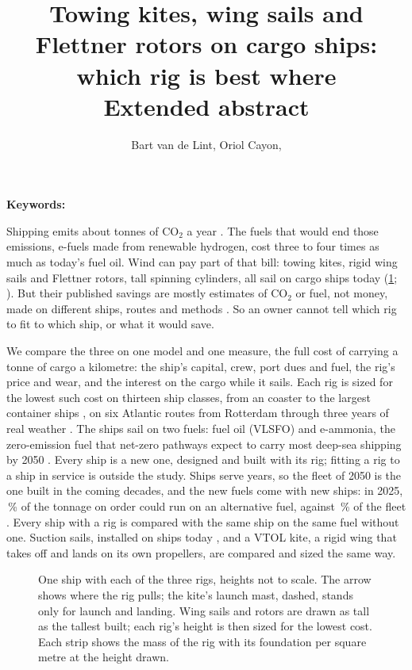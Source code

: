 \documentclass[10pt,a4paper]{article}
\title{\vspace{-1.5cm}Towing kites, wing sails and Flettner rotors on cargo ships: which rig is best where\\[0.3ex]\large Extended abstract\\[0.5ex]\small\itshape\confidential}
\author{Bart van de Lint, Oriol Cayon, \tbd{co-authors}}
\date{}
\begin{document}
\maketitle
\vspace{-1cm}

\fidelitynote

\noindent\textbf{Keywords:} \keywordlist{;}

Shipping emits about  tonnes of CO$_2$ a year \citep{faber2020}. The fuels that would end those emissions, e-fuels made from renewable hydrogen, cost three to four times as much as today's fuel oil. Wind can pay part of that bill: towing kites, rigid wing sails and Flettner rotors, tall spinning cylinders, all sail on cargo ships today (\cref{ea:rigs}; \citealp{emsa2023}). But their published savings are mostly estimates of CO$_2$ or fuel, not money, made on different ships, routes and methods \citep{huang2025}. So an owner cannot tell which rig to fit to which ship, or what it would save.

We compare the three on one model and one measure, the full cost of carrying a tonne of cargo a kilometre: the ship's capital, crew, port dues and fuel, the rig's price and wear, and the interest on the cargo while it sails. Each rig is sized for the lowest such cost on thirteen ship classes, from an  coaster to the largest container ships \citep{faber2020}, on six Atlantic routes from Rotterdam through three years of real weather \citep{hersbach2020}. The ships sail on two fuels: fuel oil (VLSFO) and e-ammonia, the zero-emission fuel that net-zero pathways expect to carry most deep-sea shipping by 2050 \citep{irena2021ship}. Every ship is a new one, designed and built with its rig; fitting a rig to a ship in service is outside the study. Ships serve  years, so the fleet of 2050 is the one built in the coming decades, and the new fuels come with new ships: in 2025, \,\% of the tonnage on order could run on an alternative fuel, against \,\% of the fleet \citep{unctad2025}. Every ship with a rig is compared with the same ship on the same fuel without one. Suction sails, installed on ships today \citep{emsa2023}, and a VTOL kite, a rigid wing that takes off and lands on its own propellers, are compared and sized the same way.

\begin{figure}[!htb]
\centering
{}
\caption{One ship with each of the three rigs, heights not to scale. The arrow shows where the rig pulls; the kite's launch mast, dashed, stands only for launch and landing. Wing sails and rotors are drawn as tall as the tallest built; each rig's height is then sized for the lowest cost. Each strip shows the mass of the rig with its foundation per square metre at the height drawn.}
\label{ea:rigs}
\end{figure}
\end{document}

